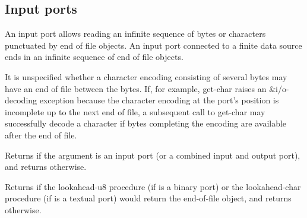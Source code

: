 \subsection{Input ports}

An input port allows reading an infinite sequence of bytes
or characters punctuated
by end of file objects. An input port connected to a finite data
source ends in an infinite sequence of end of file objects.

It is unspecified whether a character encoding consisting of several
bytes may have an end of file between the bytes.  If, for example,
{\cf get-char} raises an {\cf\&i/o-decoding} exception because the
character encoding at the port's position is incomplete up to the next
end of file, a subsequent call to {\cf get-char} may successfully
decode a character if bytes completing the encoding are available
after the end of file.

\begin{entry}{%
}

Returns \schtrue{} if the argument is an input port (or a combined input
and output port), and returns \schfalse{} otherwise.
\end{entry}

\begin{entry}{%
}
   
Returns \schtrue{}
if the {\cf lookahead-u8} procedure (if  is a binary port)
or the {\cf lookahead-char} procedure (if  is a textual port)
would return
the end-of-file object, and returns \schfalse{} otherwise.
\end{entry}


